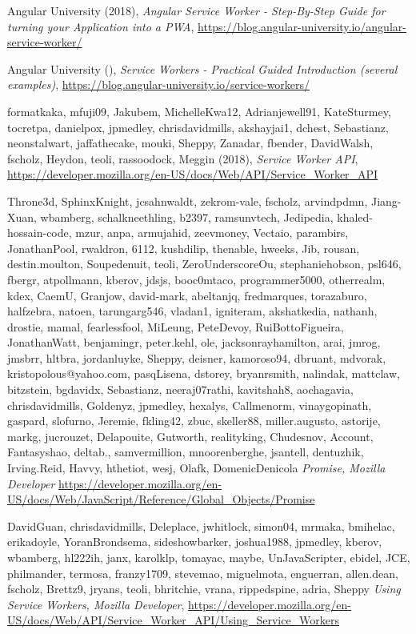 \documentclass[11pt ,a4paper , twoside , openright ]{article}
\begin{document}
\begin{thebibliography}{99}
	\bibitem{}
	Angular University (2018),
	\emph{Angular Service Worker - Step-By-Step Guide for turning your Application into a PWA},
	\url{https://blog.angular-university.io/angular-service-worker/}
	
	\bibitem{}
	Angular University (),
	\emph{Service Workers - Practical Guided Introduction (several examples)},
	\url{https://blog.angular-university.io/service-workers/}
	
	\bibitem{}
	formatkaka, mfuji09, Jakubem, MichelleKwa12, Adrianjewell91, KateSturmey, tocretpa, danielpox, jpmedley, chrisdavidmills, akshayjai1, dchest, Sebastianz, neonstalwart, jaffathecake, mouki, Sheppy, Zanadar, fbender, DavidWalsh, fscholz, Heydon, teoli, rassoodock, Meggin (2018),
	\emph{Service Worker API},
	\url{https://developer.mozilla.org/en-US/docs/Web/API/Service_Worker_API}
	
	\bibitem{}
	Throne3d, SphinxKnight, jcsahnwaldt, zekrom-vale, fscholz, arvindpdmn, Jiang-Xuan, wbamberg, schalkneethling, b2397, ramsunvtech, Jedipedia, khaled-hossain-code, mzur, anpa, armujahid, zeevmoney, Vectaio, parambirs, JonathanPool, rwaldron, 6112, kushdilip, thenable, hweeks, Jib, rousan, destin.moulton, Soupedenuit, teoli, ZeroUnderscoreOu, stephaniehobson, psl646, fbergr, atpollmann, kberov, jdsjs, booc0mtaco, programmer5000, otherrealm, kdex, CaemU, Granjow, david-mark, abeltanjq, fredmarques, torazaburo, halfzebra, natoen, tarungarg546, vladan1, igniteram, akshatkedia, nathanh, drostie, mamal, fearlessfool, MiLeung, PeteDevoy, RuiBottoFigueira, JonathanWatt, benjamingr, peter.kehl, ole, jacksonrayhamilton, arai, jmrog, jmsbrr, hltbra, jordanluyke, Sheppy, deisner, kamoroso94, dbruant, mdvorak, kristopolous@yahoo.com, pasqLisena, dstorey, bryanrsmith, nalindak, mattclaw, bitzstein, bgdavidx, Sebastianz, neeraj07rathi, kavitshah8, aochagavia, chrisdavidmills, Goldenyz, jpmedley, hexalys, Callmenorm, vinaygopinath, gaspard, slofurno, Jeremie, fkling42, zbuc, skeller88, miller.augusto, astorije, markg, jucrouzet, Delapouite, Gutworth, realityking, Chudesnov, Account, Fantasyshao, deltab., samvermillion, mnoorenberghe, jsantell, dentuzhik, Irving.Reid, Havvy, hthetiot, wesj, Olafk, DomenicDenicola
	\emph{Promise, Mozilla Developer}
	\url{https://developer.mozilla.org/en-US/docs/Web/JavaScript/Reference/Global_Objects/Promise}
	
	\bibitem{}
	DavidGuan, chrisdavidmills, Deleplace, jwhitlock, simon04, mrmaka, bmihelac, erikadoyle, YoranBrondsema, sideshowbarker, joshua1988, jpmedley, kberov, wbamberg, hl222ih, janx, karolklp, tomayac, maybe, UnJavaScripter, ebidel, JCE, philmander, termosa, franzy1709, stevemao, miguelmota, enguerran, allen.dean, fscholz, Brettz9, jryans, teoli, bhritchie, vrana, rippedspine, adria, Sheppy
	\emph{Using Service Workers, Mozilla Developer},
	\url{https://developer.mozilla.org/en-US/docs/Web/API/Service_Worker_API/Using_Service_Workers}
	

\end{thebibliography}
\end{document}
